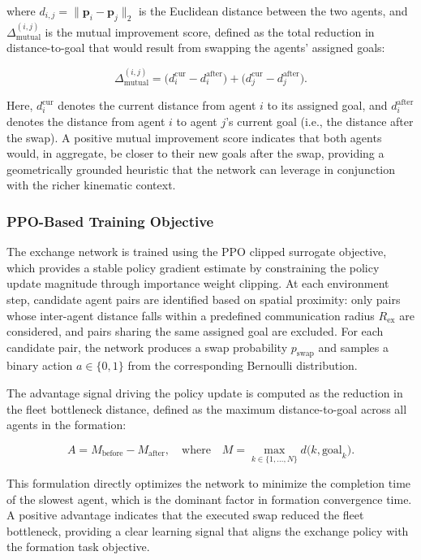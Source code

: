 where $d_{i,j} = \| \mathbf{p}_i - \mathbf{p}_j \|_2$ is the Euclidean distance between the two agents, and $\Delta_{\text{mutual}}^{(i,j)}$ is the mutual improvement score, defined as the total reduction in distance-to-goal that would result from swapping the agents' assigned goals:

\begin{equation}
    \Delta_{\text{mutual}}^{(i,j)} = \bigl(d_i^{\text{cur}} - d_i^{\text{after}}\bigr) + \bigl(d_j^{\text{cur}} - d_j^{\text{after}}\bigr).
\end{equation}

Here, $d_i^{\text{cur}}$ denotes the current distance from agent $i$ to its assigned goal, and $d_i^{\text{after}}$ denotes the distance from agent $i$ to agent $j$'s current goal (i.e., the distance after the swap). A positive mutual improvement score indicates that both agents would, in aggregate, be closer to their new goals after the swap, providing a geometrically grounded heuristic that the network can leverage in conjunction with the richer kinematic context.

\subsubsection{PPO-Based Training Objective}

The exchange network is trained using the PPO clipped surrogate objective, which provides a stable policy gradient estimate by constraining the policy update magnitude through importance weight clipping. At each environment step, candidate agent pairs are identified based on spatial proximity: only pairs whose inter-agent distance falls within a predefined communication radius $R_{\text{ex}}$ are considered, and pairs sharing the same assigned goal are excluded. For each candidate pair, the network produces a swap probability $p_{\text{swap}}$ and samples a binary action $a \in \{0, 1\}$ from the corresponding Bernoulli distribution.

The advantage signal driving the policy update is computed as the reduction in the fleet bottleneck distance, defined as the maximum distance-to-goal across all agents in the formation:

\begin{equation}
    A = M_{\text{before}} - M_{\text{after}}, \quad \text{where} \quad M = \max_{k \in \{1,\dots,N\}} d\bigl(k, \text{goal}_k\bigr).
\end{equation}

This formulation directly optimizes the network to minimize the completion time of the slowest agent, which is the dominant factor in formation convergence time. A positive advantage indicates that the executed swap reduced the fleet bottleneck, providing a clear learning signal that aligns the exchange policy with the formation task objective.

